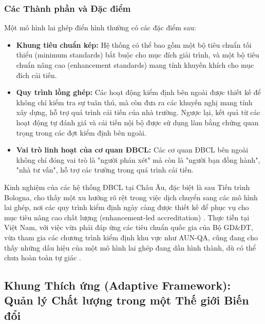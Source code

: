 \documentclass[12pt, a4paper, openany]{report}
\begin{document}
\subsubsection{Các Thành phần và Đặc điểm}
Một mô hình lai ghép điển hình thường có các đặc điểm sau:
\begin{itemize}
    \item \textbf{Khung tiêu chuẩn kép:} Hệ thống có thể bao gồm một bộ tiêu chuẩn tối thiểu (minimum standards) bắt buộc cho mục đích giải trình, và một bộ tiêu chuẩn nâng cao (enhancement standards) mang tính khuyến khích cho mục đích cải tiến.
    \item \textbf{Quy trình lồng ghép:} Các hoạt động kiểm định bên ngoài được thiết kế để không chỉ kiểm tra sự tuân thủ, mà còn đưa ra các khuyến nghị mang tính xây dựng, hỗ trợ quá trình cải tiến của nhà trường. Ngược lại, kết quả từ các hoạt động tự đánh giá và cải tiến nội bộ được sử dụng làm bằng chứng quan trọng trong các đợt kiểm định bên ngoài.
    \item \textbf{Vai trò linh hoạt của cơ quan ĐBCL:} Các cơ quan ĐBCL bên ngoài không chỉ đóng vai trò là "người phán xét" mà còn là "người bạn đồng hành", "nhà tư vấn", hỗ trợ các trường trong quá trình cải tiến.
\end{itemize}
Kinh nghiệm của các hệ thống ĐBCL tại Châu Âu, đặc biệt là sau Tiến trình Bologna, cho thấy một xu hướng rõ rệt trong việc dịch chuyển sang các mô hình lai ghép, nơi các quy trình kiểm định ngày càng được thiết kế để phục vụ cho mục tiêu nâng cao chất lượng (enhancement-led accreditation) \cite{EUA_Integration}. Thực tiễn tại Việt Nam, với việc vừa phải đáp ứng các tiêu chuẩn quốc gia của Bộ GD\&ĐT, vừa tham gia các chương trình kiểm định khu vực như AUN-QA, cũng đang cho thấy những dấu hiệu của một mô hình lai ghép đang dần hình thành, dù có thể chưa hoàn toàn tự giác \cite{VNU-CEA2023, HangNguyen2017}.


\subsection{Khung Thích ứng (Adaptive Framework): Quản lý Chất lượng trong một Thế giới Biến đổi}
\label{subsec:khung_thich_ung}
\end{document}
